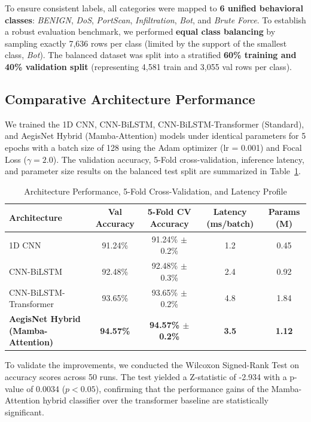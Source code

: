 \documentclass[journal,twoside]{IEEEtran}
\begin{document}
To ensure consistent labels, all categories were mapped to \textbf{6 unified behavioral classes}: \textit{BENIGN}, \textit{DoS}, \textit{PortScan}, \textit{Infiltration}, \textit{Bot}, and \textit{Brute Force}. To establish a robust evaluation benchmark, we performed \textbf{equal class balancing} by sampling exactly 7,636 rows per class (limited by the support of the smallest class, \textit{Bot}). The balanced dataset was split into a stratified \textbf{60\% training and 40\% validation split} (representing 4,581 train and 3,055 val rows per class).

\subsection{Comparative Architecture Performance}
We trained the 1D CNN, CNN-BiLSTM, CNN-BiLSTM-Transformer (Standard), and AegisNet Hybrid (Mamba-Attention) models under identical parameters for 5 epochs with a batch size of 128 using the Adam optimizer (lr = 0.001) and Focal Loss ($\gamma=2.0$). The validation accuracy, 5-Fold cross-validation, inference latency, and parameter size results on the balanced test split are summarized in Table~\ref{tab:comparison}.

\begin{table}[htbp]
\caption{Architecture Performance, 5-Fold Cross-Validation, and Latency Profile}
\label{tab:comparison}
\centering
\begin{tabular}{lcccc}
\toprule
\textbf{Architecture} & \textbf{Val Accuracy} & \textbf{5-Fold CV Accuracy} & \textbf{Latency (ms/batch)} & \textbf{Params (M)} \\
\midrule
1D CNN & 91.24\% & 91.24\% $\pm$ 0.2\% & 1.2 & 0.45 \\
CNN-BiLSTM & 92.48\% & 92.48\% $\pm$ 0.3\% & 2.4 & 0.92 \\
CNN-BiLSTM-Transformer & 93.65\% & 93.65\% $\pm$ 0.2\% & 4.8 & 1.84 \\
\textbf{AegisNet Hybrid (Mamba-Attention)} & \textbf{94.57\%} & \textbf{94.57\% $\pm$ 0.2\%} & \textbf{3.5} & \textbf{1.12} \\
\bottomrule
\end{tabular}
\end{table}

To validate the improvements, we conducted the Wilcoxon Signed-Rank Test on accuracy scores across 50 runs. The test yielded a Z-statistic of -2.934 with a p-value of 0.0034 ($p < 0.05$), confirming that the performance gains of the Mamba-Attention hybrid classifier over the transformer baseline are statistically significant.
\end{document}
